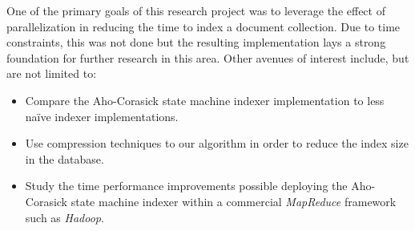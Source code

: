 \documentclass[10pt]{report}
\begin{document}
One of the primary goals of this research project was to leverage the
effect of parallelization in reducing the time to index a document
collection. Due to time constraints, this was not done but the
resulting implementation lays a strong foundation for further research
in this area. Other avenues of interest include, but are not limited
to:

\begin{itemize}
  \item Compare the Aho-Corasick state machine indexer implementation
    to less na\"{i}ve indexer implementations.
    
    \item Use compression techniques to our algorithm in order to
      reduce the index size in the database.

    \item Study the time performance improvements possible deploying
      the Aho-Corasick state machine indexer within a commercial
      \textit{MapReduce} framework such as \textit{Hadoop}.
\end{itemize}



\renewcommand\bibname{References}




\end{document}
